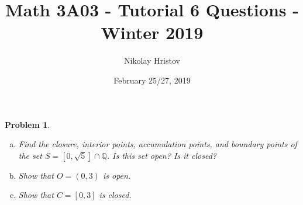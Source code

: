\documentclass[11pt]{article}
\theoremstyle{plain}
\newtheorem{problem}{Problem}
\theoremstyle{remark}
\newcommand {\mbQ} {\mathbb Q}
\begin{document}
	\title{Math 3A03 - Tutorial 6 Questions - Winter 2019}
	\author{Nikolay Hristov}
	\date{February 25/27, 2019}
	\maketitle
	
	
	\begin{problem}
		\begin{enumerate} [(a)]

		\item Find the closure, interior points, accumulation points, and boundary points of the set $S=[0,\sqrt 5] \cap \mbQ$. Is this set open? Is it closed?
		
		\item Show that $O=(0,3)$ is open. 
		
		\item Show that $C=[0,3]$ is closed.
		
                \end{enumerate}
	\end{problem}
	\iffalse
\end{document}
